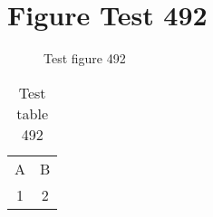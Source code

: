 \documentclass{article}
\begin{document}
\section{Figure Test 492}
\begin{figure}[h]
\caption{Test figure 492}
\end{figure}
\begin{table}[h]
\caption{Test table 492}
\begin{tabular}{cc}
A & B \\
1 & 2
\end{tabular}
\end{table}
\end{document}
